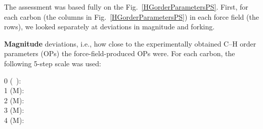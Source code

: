 \documentclass[aps,prl,superscriptaddress,twocolumn]{revtex4}
\begin{document}
The assessment was based fully on the Fig.~\ref{HGorderParametersPS}.
%
First, for each carbon (the columns in Fig.~\ref{HGorderParametersPS}) in each force field (the rows),
we looked separately at deviations in magnitude and forking.

{\bf Magnitude} deviations, i.e., how close to the experimentally obtained C--H order parameters (OPs)
the force-field-produced OPs were.
%
For each carbon, the following 5-step scale was used:
%
\begin{description}
\item [0 (~):] 
%
\item [1 ({\textsf{\tiny M}}):] 
%
\item [2  ({\textsf{\small M}}):] 
%
\item [3 ({\textsf{\large M}}):] 
%
\item [4 ({\textsf{\Large M}}):] 
\end{description}
\end{document}
